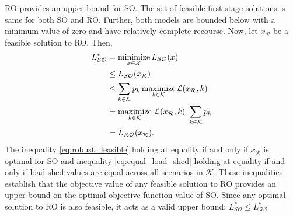 \documentclass[authoryear,preprint,review,12pt]{elsarticle}\usepackage{amssymb}
\DeclareMathOperator*{\minimize}{minimize}
\DeclareMathOperator*{\maximize}{maximize}
\begin{document}
RO provides an upper-bound for SO. The set of feasible first-stage solutions is same for both SO and RO. Further,  both models are bounded below with a minimum value of zero and have relatively complete recourse. Now, let $x_{\mathcal{R}}$ be a feasible solution to RO. Then,
\begin{subequations}
\allowdisplaybreaks
\begin{align}
    L_\mathcal{SO}^* & = \displaystyle{\minimize_{x\in \mathcal{X}} L_\mathcal{SO}(x)} \\     
    & \leq L_\mathcal{SO}(x_{\mathcal{R}}) \label{eq:robust_feasible}\\
    & \leq \sum_{k \in \mathcal{K}} p_k \, \displaystyle{\maximize_{k \in \mathcal{K}}} \, \mathcal{L}(x_{\mathcal{R}},k) \label{eq:equal_load_shed} \\
    & = \displaystyle{\maximize_{k \in \mathcal{K}}} \,\, \mathcal{L}(x_{\mathcal{R}},k) \,\, \sum_{k \in \mathcal{K}} p_k\\
    & = L_\mathcal{RO}(x_{\mathcal{R}}).
\end{align}
\end{subequations}
The inequality \eqref{eq:robust_feasible} holding at equality if and only if $x_{\mathcal{R}}$ is optimal for SO and inequality \eqref{eq:equal_load_shed} holding at equality if and only if load shed values are equal across all scenarios in $\mathcal{K}$. These inequalities establish that the objective value of any feasible solution to RO provides an upper bound on the optimal objective function value of SO. Since any optimal solution to RO is also feasible, it acts as a valid upper bound: $L_\mathcal{SO}^* \leq L_\mathcal{RO}^*$
\end{document}
